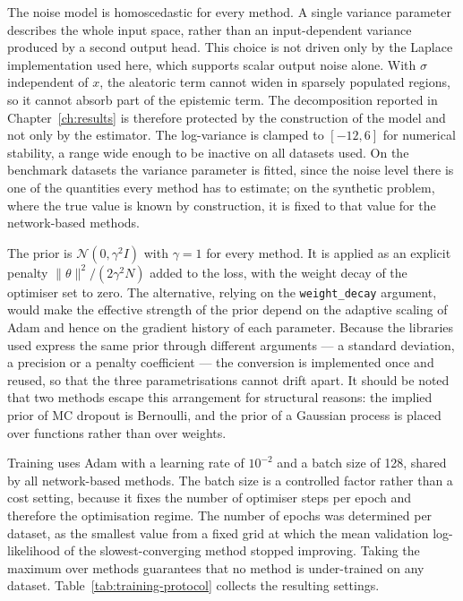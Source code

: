 The noise model is homoscedastic for every method. A single variance parameter
describes the whole input space, rather than an input-dependent variance produced
by a second output head. This choice is not driven only by the Laplace implementation
used here, which supports scalar output noise alone. With $\sigma$ independent of $x$,
the aleatoric term cannot widen in sparsely populated regions, so it cannot absorb part
of the epistemic term. The decomposition reported in Chapter~\ref{ch:results} is
therefore protected by the construction of the model and not only by the estimator.
The log-variance is clamped to $[-12, 6]$ for numerical stability, a range wide
enough to be inactive on all datasets used. On the benchmark datasets the variance
parameter is fitted, since the noise level there is one of the quantities every method
has to estimate; on the synthetic problem, where the true value is known by
construction, it is fixed to that value for the network-based methods.

The prior is $\mathcal{N}(0, \gamma^2 I)$ with $\gamma = 1$ for every method. It is
applied as an explicit penalty $\lVert \theta \rVert^2 / (2 \gamma^2 N)$ added to the
loss, with the weight decay of the optimiser set to zero. The alternative, relying on
the \texttt{weight\_decay} argument, would make the effective strength of the prior
depend on the adaptive scaling of Adam and hence on the gradient history of each
parameter. Because the libraries used express the same prior through different
arguments --- a standard deviation, a precision or a penalty coefficient --- the
conversion is implemented once and reused, so that the three parametrisations cannot
drift apart. It should be noted that two methods escape this arrangement for
structural reasons: the implied prior of MC dropout is Bernoulli, and the prior of a
Gaussian process is placed over functions rather than over weights.

Training uses Adam with a learning rate of $10^{-2}$ and a batch size of 128, shared
by all network-based methods. The batch size is a controlled factor rather than a
cost setting, because it fixes the number of optimiser steps per epoch and therefore
the optimisation regime. The number of epochs was determined per dataset, as the
smallest value from a fixed grid at which the mean validation log-likelihood of the
slowest-converging method stopped improving. Taking the maximum over methods
guarantees that no method is under-trained on any dataset.
Table~\ref{tab:training-protocol} collects the resulting settings.

